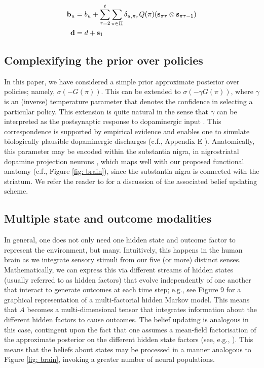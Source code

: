 \documentclass[review,12pt,authoryear]{elsarticle}
\begin{document}
\begin{align}
    \bold b_u &= b_u + \sum_{\tau =2}^t \sum_{\pi \in \Pi} \delta_{u, \pi_\tau}  Q(\pi)(\bold s_{\pi\tau} \otimes \bold s_{\pi\tau-1}) \\
    \bold d&= d +\bold s_1
\end{align}


\subsection{Complexifying the prior over policies}
\label{appendix: gamma}

In this paper, we have considered a simple prior approximate posterior over policies; namely, $\sigma (-G(\pi))$. This can be extended to $\sigma (-\gamma G(\pi))$, where $\gamma$ is an (inverse) temperature parameter that denotes the confidence in selecting a particular policy. This extension is quite natural in the sense that $\gamma$ can be interpreted as the postsynaptic response to dopaminergic input \citep{fitzgeraldDopamineRewardLearning2015,fristonAnatomyChoiceDopamine2014}. This correspondence is supported by empirical evidence \citep{schwartenbeckDopaminergicMidbrainEncodes2015} and enables one to simulate biologically plausible dopaminergic discharges (c.f., Appendix E \citep{fristonActiveInferenceProcess2017}). Anatomically, this parameter may be encoded within the substantia nigra, in nigrostriatal dopamine projection neurons \citep{schwartenbeckDopaminergicMidbrainEncodes2015}, which maps well with our proposed functional anatomy (c.f., Figure \ref{fig: brain}), since the substantia nigra is connected with the striatum. We refer the reader to \citep{fristonActiveInferenceProcess2017} for a discussion of the associated belief updating scheme.

 
\subsection{Multiple state and outcome modalities}
\label{appendix: multiple state outcome}

In general, one does not only need one hidden state and outcome factor to represent the environment, but many. Intuitively, this happens in the human brain as we integrate sensory stimuli from our five (or more) distinct senses. Mathematically, we can express this via different streams of hidden states (usually referred to as hidden factors) that evolve independently of one another that interact to generate outcomes at each time step; e.g., see Figure 9 \citep{jordanIntroductionVariationalMethods1998} for a graphical representation of a multi-factorial hidden Markov model. This means that $A$ becomes a multi-dimensional tensor that integrates information about the different hidden factors to cause outcomes. The belief updating is analogous in this case, contingent upon the fact that one assumes a mean-field factorisation of the approximate posterior on the different hidden state factors (see, e.g., \citep{mirzaSceneConstructionVisual2016,fristonFunctionalAnatomyTime2016}). This means that the beliefs about states may be processed in a manner analogous to Figure \ref{fig: brain}, invoking a greater number of neural populations.
\end{document}
